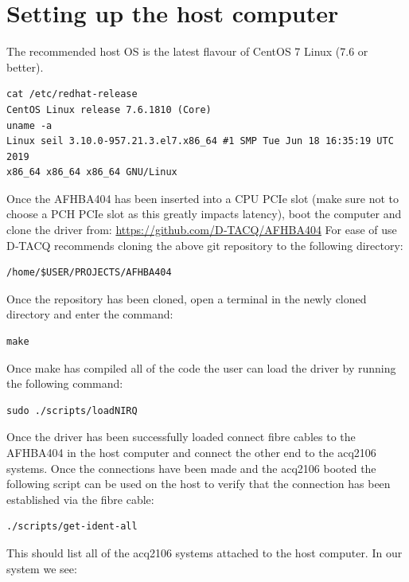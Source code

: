 \documentclass{article}
\begin{document}
\section{Setting up the host computer} \label{settinguphost}
The recommended host OS is the latest flavour of CentOS 7 Linux (7.6 or better).

\begin{verbatim}
cat /etc/redhat-release 
CentOS Linux release 7.6.1810 (Core) 
uname -a
Linux seil 3.10.0-957.21.3.el7.x86_64 #1 SMP Tue Jun 18 16:35:19 UTC 2019
x86_64 x86_64 x86_64 GNU/Linux
\end{verbatim}

Once the AFHBA404 has been inserted into a CPU PCIe slot (make sure not to choose a PCH PCIe slot as this greatly impacts latency), boot the computer and clone the driver from:
\newline
\href{https://github.com/D-TACQ/AFHBA404}{https://github.com/D‑TACQ/AFHBA404}
\newline
For ease of use D‑TACQ  recommends cloning the above git repository to the following directory:

\begin{verbatim}
/home/$USER/PROJECTS/AFHBA404
\end{verbatim}

Once the repository has been cloned, open a terminal in the newly cloned directory and enter the command:

\begin{verbatim}
make
\end{verbatim}

Once make has compiled all of the code the user can load the driver by running the following command:

\begin{verbatim}
sudo ./scripts/loadNIRQ
\end{verbatim}

Once the driver has been successfully loaded connect fibre cables to the AFHBA404 in the host computer and connect the other end to the acq2106 systems.
Once the connections have been made and the acq2106 booted the following script can be used on the host to verify that the connection has been established via the fibre cable:

\begin{verbatim}
./scripts/get-ident-all
\end{verbatim}

This should list all of the acq2106 systems attached to the host computer. In our system we see:
\end{document}

